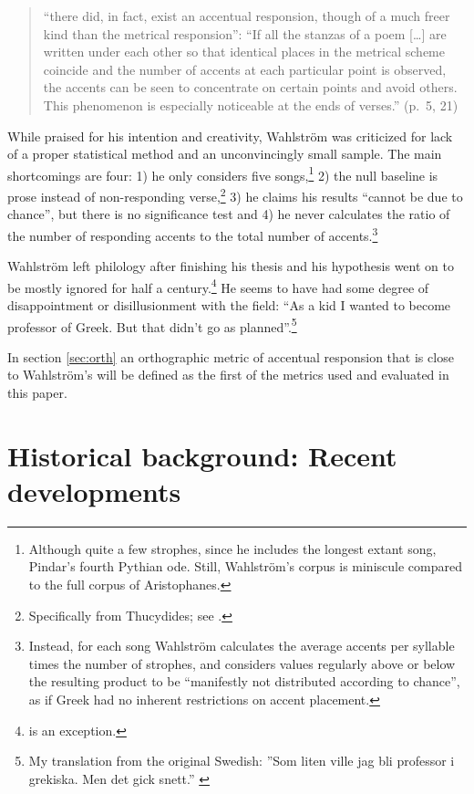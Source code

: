\documentclass[twoside]{article}
\begin{document}
\begin{quote}
    ``there did, in fact, exist an accentual responsion, though of a much freer kind than the metrical responsion'': ``If all the stanzas of a poem [\ldots] are written under each other so that identical places in the metrical scheme coincide and the number of accents at each particular point is observed, the accents can be seen to concentrate on certain points and avoid others. This phenomenon is especially noticeable at the ends of verses.'' (p.\ 5, 21)
\end{quote}

While praised for his intention and creativity, Wahlström was criticized for lack of a proper statistical method and an unconvincingly small sample. \parencite{brunelReviewWahlstrom19701972} 
The main shortcomings are four: 1) he only considers five songs,\footnote{Although quite a few strophes, since he includes the longest extant song, Pindar’s fourth Pythian ode. Still, Wahlström's corpus is miniscule compared to the full corpus of Aristophanes.} 2) the null baseline is prose instead of non-responding verse,\footnote{Specifically from Thucydides; see \textcite[18-19]{wahlstromAccentualResponsionGreek1970}.} 3) he claims his results ``cannot be due to chance'', but there is no significance test and 4) he never calculates the ratio of the number of responding accents to the total number of accents.\footnote{Instead, for each song Wahlström calculates the average accents per syllable times the number of strophes, and considers values regularly above or below the resulting product to be ``manifestly not distributed according to chance'', as if Greek had no inherent restrictions on accent placement.}

Wahlström left philology after finishing his thesis and his hypothesis went on to be mostly ignored for half a century.\footnote{\textcite{comottiMelodiaAccentoDi1989} is an exception.} He seems to have had some degree of disappointment or disillusionment with the field: ``As a kid I wanted to become professor of Greek. But that didn’t go as planned''.\footnote{My translation from the original Swedish: ''Som liten ville jag bli professor i grekiska. Men det gick snett.'' \parencite{boksampoWahlström}}

In section \autoref{sec:orth} an orthographic metric of accentual responsion that is close to Wahlström's will be defined as the first of the metrics used and evaluated in this paper.

\section{Historical background: Recent developments}\label{sec:hist2}
\end{document}
